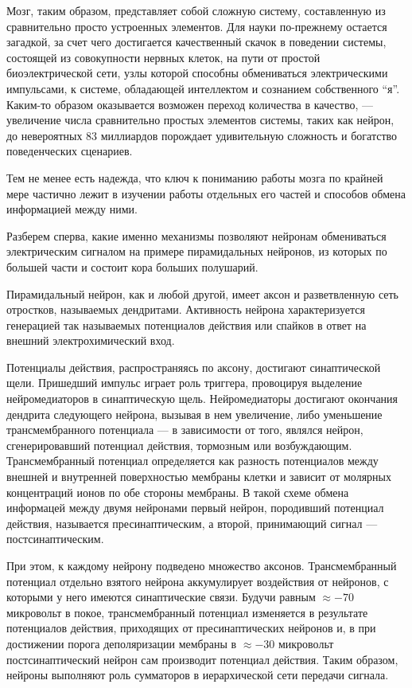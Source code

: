 Мозг, таким образом, представляет собой сложную систему, составленную из сравнительно
просто устроенных элементов.
Для науки по-прежнему остается загадкой, за счет чего достигается
качественный скачок в поведении системы, состоящей из совокупности
нервных клеток, на пути от простой биоэлектрической сети,
узлы которой способны обмениваться электрическими импульсами, к
системе, обладающей интеллектом и сознанием собственного ``я''.
Каким-то образом оказывается возможен переход количества в качество, --- увеличение
числа сравнительно простых элементов системы,
таких как нейрон, до невероятных 83 миллиардов порождает удивительную
сложность и богатство поведенческих сценариев.

Тем не менее есть надежда, что ключ к пониманию работы мозга по крайней мере
частично лежит в изучении работы отдельных его частей и
способов обмена информацией между ними.

Разберем сперва, какие именно механизмы позволяют нейронам обмениваться
электрическим сигналом на примере пирамидальных нейронов, из которых по
большей части и состоит кора больших полушарий.

Пирамидальный нейрон, как и любой другой, имеет аксон и
разветвленную сеть отростков, называемых дендритами.
Активность нейрона характеризуется генерацией так называемых
потенциалов действия или спайков в ответ на внешний электрохимический вход.

Потенциалы действия, распространяясь по аксону, достигают синаптической
щели. Пришедший импульс играет роль триггера, провоцируя выделение
нейромедиаторов в  синаптическую щель. Нейромедиаторы достигают окончания
дендрита следующего нейрона, вызывая в нем увеличение, либо уменьшение
трансмембранного потенциала --- в зависимости от того, являлся
нейрон, сгенерировавший потенциал действия, тормозным или возбуждающим.
Трансмембранный потенциал определяется как разность потенциалов между
внешней и внутренней поверхностью мембраны клетки и зависит от молярных
концентраций ионов по обе стороны мембраны.
В такой схеме обмена информацей между двумя нейронами первый нейрон,
породивший потенциал действия, называется пресинаптическим, а второй,
принимающий сигнал --- постсинаптическим.

При этом, к каждому нейрону подведено множество аксонов.
Трансмембранный потенциал отдельно взятого нейрона
аккумулирует воздействия от нейронов, с которыми у него
имеются синаптические связи. Будучи равным $\approx -70$ микровольт
в покое, трансмембранный потенциал изменяется в результате
потенциалов действия, приходящих от пресинаптических нейронов и,
в при достижении порога деполяризации мембраны в $\approx -30$ микровольт
постсинаптический нейрон сам производит потенциал действия.
Таким образом,
нейроны выполняют роль сумматоров в иерархической сети передачи сигнала.


